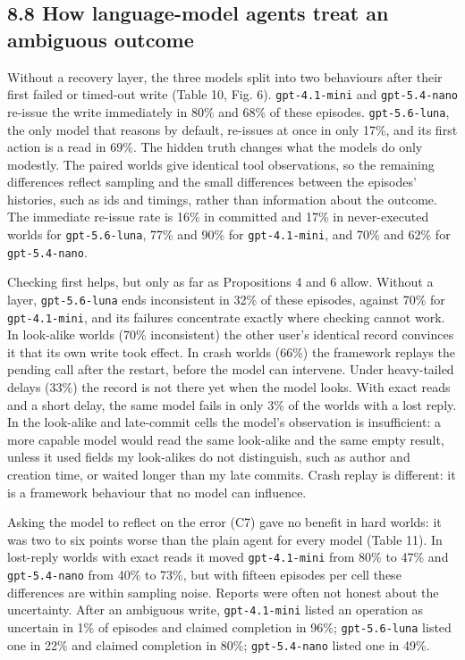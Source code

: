 \documentclass[
  10pt,
]{article}
\begin{document}
\hypertarget{how-language-model-agents-treat-an-ambiguous-outcome}{%
\subsection*{8.8 How language-model agents treat an ambiguous
outcome}\label{how-language-model-agents-treat-an-ambiguous-outcome}}

Without a recovery layer, the three models split into two behaviours
after their first failed or timed-out write (Table 10, Fig. 6).
\texttt{gpt-4.1-mini} and \texttt{gpt-5.4-nano} re-issue the write
immediately in 80\% and 68\% of these episodes. \texttt{gpt-5.6-luna},
the only model that reasons by default, re-issues at once in only 17\%,
and its first action is a read in 69\%. The hidden truth changes what
the models do only modestly. The paired worlds give identical tool
observations, so the remaining differences reflect sampling and the
small differences between the episodes' histories, such as ids and
timings, rather than information about the outcome. The immediate
re-issue rate is 16\% in committed and 17\% in never-executed worlds for
\texttt{gpt-5.6-luna}, 77\% and 90\% for \texttt{gpt-4.1-mini}, and 70\%
and 62\% for \texttt{gpt-5.4-nano}.

Checking first helps, but only as far as Propositions 4 and 6 allow.
Without a layer, \texttt{gpt-5.6-luna} ends inconsistent in 32\% of
these episodes, against 70\% for \texttt{gpt-4.1-mini}, and its failures
concentrate exactly where checking cannot work. In look-alike worlds
(70\% inconsistent) the other user's identical record convinces it that
its own write took effect. In crash worlds (66\%) the framework replays
the pending call after the restart, before the model can intervene.
Under heavy-tailed delays (33\%) the record is not there yet when the
model looks. With exact reads and a short delay, the same model fails in
only 3\% of the worlds with a lost reply. In the look-alike and
late-commit cells the model's observation is insufficient: a more
capable model would read the same look-alike and the same empty result,
unless it used fields my look-alikes do not distinguish, such as author
and creation time, or waited longer than my late commits. Crash replay
is different: it is a framework behaviour that no model can influence.

Asking the model to reflect on the error (C7) gave no benefit in hard
worlds: it was two to six points worse than the plain agent for every
model (Table 11). In lost-reply worlds with exact reads it moved
\texttt{gpt-4.1-mini} from 80\% to 47\% and \texttt{gpt-5.4-nano} from
40\% to 73\%, but with fifteen episodes per cell these differences are
within sampling noise. Reports were often not honest about the
uncertainty. After an ambiguous write, \texttt{gpt-4.1-mini} listed an
operation as uncertain in 1\% of episodes and claimed completion in
96\%; \texttt{gpt-5.6-luna} listed one in 22\% and claimed completion in
80\%; \texttt{gpt-5.4-nano} listed one in 49\%.
\end{document}

